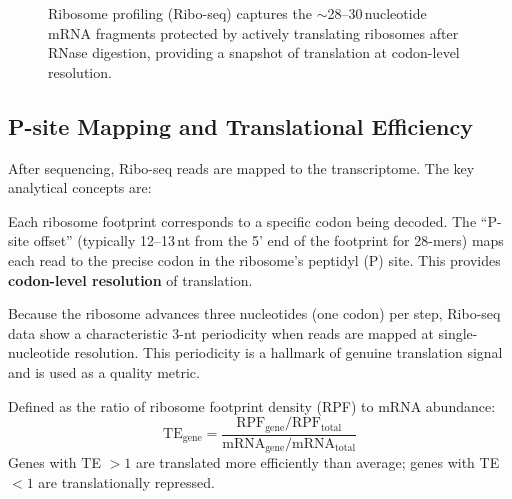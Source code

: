 \begin{figure}[htbp]
\caption[Principle of ribosome profiling (Ribo-seq).]{Ribosome profiling (Ribo-seq) captures the $\sim$28--30\,nucleotide mRNA fragments protected by actively translating ribosomes after RNase digestion, providing a snapshot of translation at codon-level resolution.}
\label{fig:specialized:riboseq}
\end{figure}

\subsection{P-site Mapping and Translational Efficiency}
\label{subsec:specialized:riboseq-analysis}

After sequencing, Ribo-seq reads are mapped to the transcriptome. The key analytical concepts are:

\begin{description}[style=nextline, itemsep=3pt]
  \item[P-site assignment] Each ribosome footprint corresponds to a specific codon being decoded. The ``P-site offset'' (typically 12--13\,nt from the 5' end of the footprint for 28-mers) maps each read to the precise codon in the ribosome's peptidyl (P) site. This provides \textbf{codon-level resolution} of translation.

  \item[Three-nucleotide periodicity] Because the ribosome advances three nucleotides (one codon) per step, Ribo-seq data show a characteristic 3-nt periodicity when reads are mapped at single-nucleotide resolution. This periodicity is a hallmark of genuine translation signal and is used as a quality metric.

  \item[Translational efficiency (TE)] Defined as the ratio of ribosome footprint density (RPF) to mRNA abundance:
  \[
  \text{TE}_{\text{gene}} = \frac{\text{RPF}_{\text{gene}} / \text{RPF}_{\text{total}}}{\text{mRNA}_{\text{gene}} / \text{mRNA}_{\text{total}}}
  \]
  Genes with TE $> 1$ are translated more efficiently than average; genes with TE $< 1$ are translationally repressed.
\end{description}

